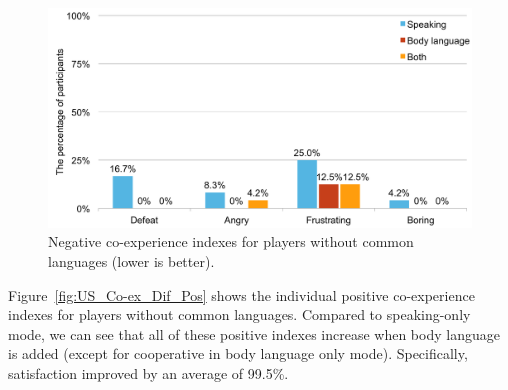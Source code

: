 \begin{figure}[!t]
\centering
\includegraphics[width=0.9\columnwidth]{Figures/US_Co-ex_Dif_Neg.pdf}
\caption{Negative co-experience indexes for players without common languages (lower is better).}
\label{fig:US_Co-ex_Dif_Neg}
\end{figure}

Figure~\ref{fig:US_Co-ex_Dif_Pos} shows the individual positive co-experience indexes for players without common languages. Compared to speaking-only mode, we can see that all of these positive indexes increase when body language is added (except for cooperative in body language only mode). Specifically, satisfaction improved by an average of 99.5\%. 





